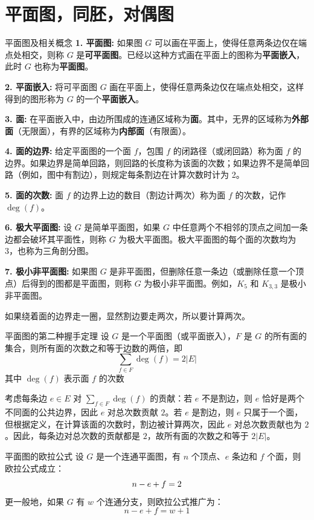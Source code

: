 \documentclass[lang=cn,11pt]{elegantbook}
\begin{document}
\section{平面图，同胚，对偶图}
\begin{definition}{平面图及相关概念}
\textbf{1. 平面图:}
如果图 $G$ 可以画在平面上，使得任意两条边仅在端点处相交，则称 $G$ 是\textbf{可平面图}。已经以这种方式画在平面上的图称为\textbf{平面嵌入}，此时 $G$ 也称为\textbf{平面图}。

\textbf{2. 平面嵌入:}
将可平面图 $G$ 画在平面上，使得任意两条边仅在端点处相交，这样得到的图形称为 $G$ 的一个\textbf{平面嵌入}。

\textbf{3. 面:}
在平面嵌入中，由边所围成的连通区域称为\textbf{面}。其中，无界的区域称为\textbf{外部面}（无限面），有界的区域称为\textbf{内部面}（有限面）。

\textbf{4. 面的边界:}
给定平面图的一个面 $f$，包围 $f$ 的闭路径（或闭回路）称为面 $f$ 的边界。如果边界是简单回路，则回路的长度称为该面的次数；如果边界不是简单回路（例如，图中有割边），则规定每条割边在计算次数时计为 2。

\textbf{5. 面的次数:}
面 $f$ 的边界上边的数目（割边计两次）称为面 $f$ 的次数，记作 $\deg(f)$。

\textbf{6. 极大平面图:}
设 $G$ 是简单平面图，如果 $G$ 中任意两个不相邻的顶点之间加一条边都会破坏其平面性，则称 $G$ 为极大平面图。极大平面图的每个面的次数均为 3，也称为三角剖分图。

\textbf{7. 极小非平面图:}
如果图 $G$ 是非平面图，但删除任意一条边（或删除任意一个顶点）后得到的图都是平面图，则称 $G$ 为极小非平面图。例如，$K_5$ 和 $K_{3,3}$ 是极小非平面图。
\end{definition}
如果绕着面的边界走一圈，显然割边要走两次，所以要计算两次。
\begin{theorem}{平面图的第二种握手定理}
设 $G$ 是一个平面图（或平面嵌入），$F$ 是 $G$ 的所有面的集合，则所有面的次数之和等于边数的两倍，即
\[
\sum_{f \in F} \deg(f) = 2|E|
\]
其中 $\deg(f)$ 表示面 $f$ 的次数
\end{theorem}
考虑每条边 $e \in E$ 对 $\sum_{f \in F} \deg(f)$ 的贡献：若 $e$ 不是割边，则 $e$ 恰好是两个不同面的公共边界，因此 $e$ 对总次数贡献 $2$。若 $e$ 是割边，则 $e$ 只属于一个面，但根据定义，在计算该面的次数时，割边被计算两次，因此 $e$ 对总次数贡献也为 $2$。因此，每条边对总次数的贡献都是 $2$，故所有面的次数之和等于 $2|E|$。
\begin{theorem}{平面图的欧拉公式}
设 $G$ 是一个连通平面图，有 $n$ 个顶点、$e$ 条边和 $f$ 个面，则欧拉公式成立：\vspace{-10pt}
\[
n - e + f = 2\vspace{-10pt}
\]
更一般地，如果 $G$ 有 $w$ 个连通分支，则欧拉公式推广为：\vspace{-10pt}
\[
n - e + f = w + 1
\]
\end{theorem}
\end{document}
